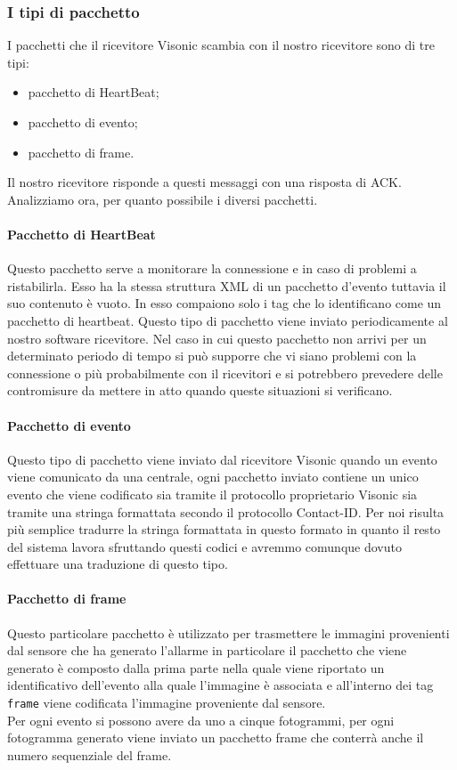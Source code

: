 \subsubsection{I tipi di pacchetto}
I pacchetti che il ricevitore Visonic scambia con il nostro ricevitore sono di tre tipi:
\begin{itemize}
	\item pacchetto di HeartBeat;
	\item pacchetto di evento;
	\item pacchetto di frame.
\end{itemize}
Il nostro ricevitore risponde a questi messaggi con una risposta di ACK. Analizziamo ora, per quanto possibile i diversi pacchetti.
\paragraph{Pacchetto di HeartBeat}
Questo pacchetto serve a monitorare la connessione e in caso di problemi a ristabilirla. Esso ha la stessa struttura XML di un pacchetto d'evento tuttavia il suo contenuto è vuoto. In esso compaiono solo i tag che lo identificano come un pacchetto di heartbeat. Questo tipo di pacchetto viene inviato periodicamente al nostro software ricevitore. Nel caso in cui questo pacchetto non arrivi per un determinato periodo di tempo si può supporre che vi siano problemi con la connessione o più probabilmente con il ricevitori e si potrebbero prevedere delle contromisure da mettere in atto quando queste situazioni si verificano.
\paragraph{Pacchetto di evento}
Questo tipo di pacchetto viene inviato dal ricevitore Visonic quando un evento viene comunicato da una centrale, ogni pacchetto inviato contiene un unico evento che viene codificato sia tramite il protocollo proprietario Visonic sia tramite una stringa formattata secondo il protocollo Contact-ID.
Per noi risulta più semplice tradurre la stringa formattata in questo formato in quanto il resto del sistema lavora sfruttando questi codici e avremmo comunque dovuto effettuare una traduzione di questo tipo.
\paragraph{Pacchetto di frame}
Questo particolare pacchetto è utilizzato per trasmettere le immagini provenienti dal sensore che ha generato l'allarme in particolare il pacchetto che viene generato è composto dalla prima parte nella quale viene riportato un identificativo dell'evento alla quale l'immagine è associata e all'interno dei tag \texttt{frame} viene codificata l'immagine proveniente dal sensore.\\
Per ogni evento si possono avere da uno a cinque fotogrammi, per ogni fotogramma generato viene inviato un pacchetto frame che conterrà anche il numero sequenziale del frame.
